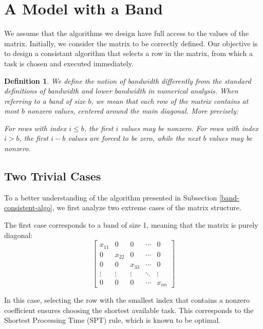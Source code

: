 \documentclass{article}
\newtheorem{definition}{Definition}
\begin{document}
\section{A Model with a Band}
We assume that the algorithms we design have full access to the values of the matrix. Initially, we consider the matrix to be correctly defined. Our objective is to design a consistant algorithm that selects a row in the matrix, from which a task is chosen and executed immediately.

\begin{definition}
We define the notion of \emph{bandwidth} differently from the standard definitions of bandwidth and lower bandwidth in numerical analysis. When referring to a band of size $b$, we mean that each row of the matrix contains at most $b$ nonzero values, centered around the main diagonal. More precisely:

For rows with index $i \leq b$, the first $i$ values may be nonzero.
For rows with index $i > b$, the first $i - b$ values are forced to be zero, while the next $b$ values may be nonzero.
\end{definition}

\subsection{Two Trivial Cases}To a better understanding of  the algorithm presented in Subsection \ref{band-consistent-algo}, we first analyze two extreme cases of the matrix structure.

The first case corresponds to a band of size 1, meaning that the matrix is purely diagonal:  
\[
\begin{bmatrix}  
x_{11} & 0 & 0 & \cdots & 0 \\  
0 & x_{22} & 0 & \cdots & 0 \\  
0 & 0 & x_{33} & \cdots & 0 \\  
\vdots & \vdots & \vdots & \ddots & \vdots \\  
0 & 0 & 0 & \cdots & x_{nn}  
\end{bmatrix}  
\]

In this case, selecting the row with the smallest index that contains a nonzero coefficient ensures choosing the shortest available task. This corresponds to the Shortest Processing Time (SPT) rule, which is known to be optimal.
\end{document}
